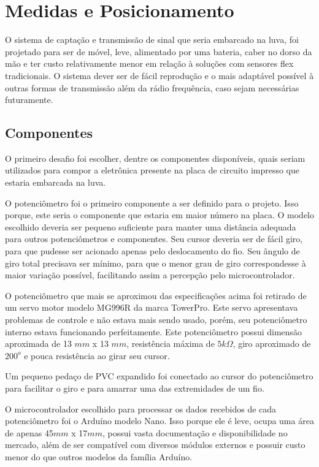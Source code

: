 \documentclass[
	12pt,				%
	openright,			%
	oneside,			%
	a4paper,			%
	english,			%
	brazil				%
	]{abntex2}
\begin{document}
		\section{Medidas e Posicionamento}	

			O sistema de captação e transmissão de sinal que seria embarcado na luva, foi projetado para ser de móvel, leve, alimentado por uma bateria, caber no dorso da mão e ter custo relativamente menor em relação à soluções com sensores flex tradicionais. O sistema dever ser de fácil reprodução e o mais adaptável possível à outras formas de transmissão além da rádio frequência, caso sejam necessárias futuramente.

			\subsection{Componentes}

			O primeiro desafio foi escolher, dentre os componentes disponíveis, quais seriam utilizados para compor a eletrônica presente na placa de circuito impresso que estaria embarcada na luva.

			O potenciômetro foi o primeiro componente a ser definido para o projeto. Isso porque, este seria o componente que estaria em maior número na placa. O modelo escolhido deveria ser pequeno suficiente para manter uma distância adequada para outros potenciômetros e componentes. Seu cursor deveria ser de fácil giro, para que pudesse ser acionado apenas pelo deslocamento do fio. Seu ângulo de giro total precisava ser mínimo, para que o menor grau de giro correspondesse à maior variação possível, facilitando assim a percepção pelo microcontrolador.

			O potenciômetro que mais se aproximou das especificações acima foi retirado de um servo motor modelo MG996R da marca TowerPro. Este servo apresentava problemas de controle e não estava mais sendo usado, porém, seu potenciômetro interno estava funcionando perfeitamente. Este potenciômetro possui dimensão aproximada de 13 $mm$ x 13 $mm$, resistência máxima de $5 k\Omega$, giro aproximado de $200^{o}$ e pouca resistência ao girar seu cursor. 

			Um pequeno pedaço de PVC expandido foi conectado ao cursor do potenciômetro para facilitar o giro e para amarrar uma das extremidades de um fio.

			O microcontrolador escolhido para processar os dados recebidos de cada potenciômetro foi o Arduíno modelo Nano. Isso porque ele é leve, ocupa uma área de apenas 45$mm$ x 17$mm$, possui vasta documentação e disponibilidade no mercado, além de ser compatível com diversos módulos externos e possuir custo menor do que outros modelos da família Arduíno.
\end{document}
